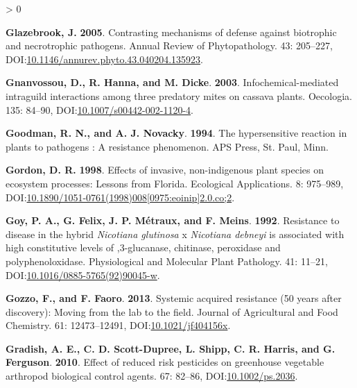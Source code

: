 \documentclass{ufdissertation}[overrideChapters] %
\newlength{\cslhangindent}
\newenvironment{CSLReferences}[2] %
 {%
  \setlength{\parindent}{0pt}
  \ifodd #1 \everypar{\setlength{\hangindent}{\cslhangindent}}\ignorespaces\fi
  \ifnum #2 > 0
  \setlength{\parskip}{#2\baselineskip}
  \fi
 }%
 {}
\begin{document}
{\begin{CSLReferences}{1}{1}
\leavevmode{}%
\textbf{Glazebrook, J.} \textbf{2005}. Contrasting mechanisms of defense against biotrophic and necrotrophic pathogens. Annual Review of Phytopathology. 43: 205--227, DOI:\href{https://doi.org/10.1146/annurev.phyto.43.040204.135923}{10.1146/annurev.phyto.43.040204.135923}.

\leavevmode{}%
\textbf{Gnanvossou, D., R. Hanna, and M. Dicke}. \textbf{2003}. Infochemical-mediated intraguild interactions among three predatory mites on cassava plants. Oecologia. 135: 84--90, DOI:\href{https://doi.org/10.1007/s00442-002-1120-4}{10.1007/s00442-002-1120-4}.

\leavevmode{}%
\textbf{Goodman, R. N., and A. J. Novacky}. \textbf{1994}. The hypersensitive reaction in plants to pathogens : A resistance phenomenon. APS Press, St. Paul, Minn.

\leavevmode{}%
\textbf{Gordon, D. R.} \textbf{1998}. Effects of invasive, non-indigenous plant species on ecosystem processes: Lessons from {Florida}. Ecological Applications. 8: 975--989, DOI:\href{https://doi.org/10.1890/1051-0761(1998)008\%5B0975:eoinip\%5D2.0.co;2}{10.1890/1051-0761(1998)008{[}0975:eoinip{]}2.0.co;2}.

\leavevmode{}%
\textbf{Goy, P. A., G. Felix, J. P. Métraux, and F. Meins}. \textbf{1992}. Resistance to disease in the hybrid {\emph{Nicotiana glutinosa}} x {\emph{Nicotiana debneyi}} is associated with high constitutive levels of ,3-glucanase, chitinase, peroxidase and polyphenoloxidase. Physiological and Molecular Plant Pathology. 41: 11--21, DOI:\href{https://doi.org/10.1016/0885-5765(92)90045-w}{10.1016/0885-5765(92)90045-w}.

\leavevmode{}%
\textbf{Gozzo, F., and F. Faoro}. \textbf{2013}. Systemic acquired resistance (50 years after discovery): Moving from the lab to the field. Journal of Agricultural and Food Chemistry. 61: 12473--12491, DOI:\href{https://doi.org/10.1021/jf404156x}{10.1021/jf404156x}.

\leavevmode{}%
\textbf{Gradish, A. E., C. D. Scott-Dupree, L. Shipp, C. R. Harris, and G. Ferguson}. \textbf{2010}. Effect of reduced risk pesticides on greenhouse vegetable arthropod biological control agents. 67: 82--86, DOI:\href{https://doi.org/10.1002/ps.2036}{10.1002/ps.2036}.


\end{CSLReferences}}
\end{document}
